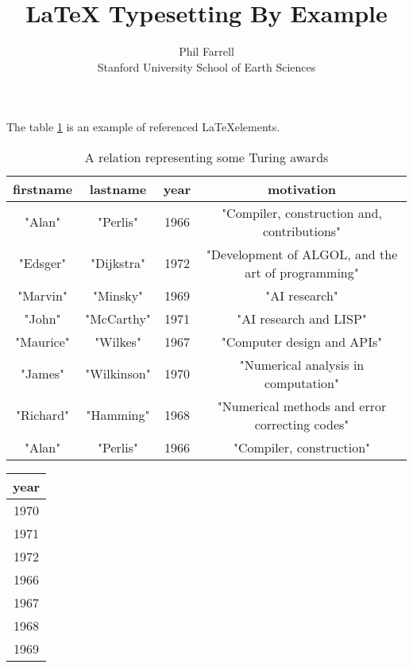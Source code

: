 \setlength{\topmargin}{-.5in}
\setlength{\textheight}{9in}
\setlength{\oddsidemargin}{.125in}
\setlength{\textwidth}{6.25in}

\title{LaTeX Typesetting By Example}
\author{Phil Farrell\\
Stanford University School of Earth Sciences}
\renewcommand{\today}{November 2, 1994}
\maketitle

The table \ref{table:relation_turingaward} is an example of referenced \LaTeX elements.

\begin{table}[h!]
\centering
\begin{tabular}{||c c c c||}
    \hline
    firstname & lastname & year & motivation \\ [0.5ex]
    \hline\hline
        "Alan" & "Perlis" & 1966 & "Compiler, construction and, contributions" \\
        "Edsger" & "Dijkstra" & 1972 & "Development of ALGOL, and the art of programming" \\
        "Marvin" & "Minsky" & 1969 & "AI research" \\
        "John" & "McCarthy" & 1971 & "AI research and LISP" \\
        "Maurice" & "Wilkes" & 1967 & "Computer design and APIs" \\
        "James" & "Wilkinson" & 1970 & "Numerical analysis in computation" \\
        "Richard" & "Hamming" & 1968 & "Numerical methods and error correcting codes" \\
        "Alan" & "Perlis" & 1966 & "Compiler, construction" \\ [1ex]
    \hline
\end{tabular}
\caption{A relation representing some Turing awards}
\label{table:relation_turingaward}
\end{table}

\begin{table}[h!]
\centering
\begin{tabular}{||c||}
    \hline
    year \\ [0.5ex]
    \hline\hline
        1970 \\
        1971 \\
        1972 \\
        1966 \\
        1967 \\
        1968 \\
        1969 \\ [1ex]
    \hline
\end{tabular}
\label{table:relation_turingaward_projection_t9o21n}
\end{table}



